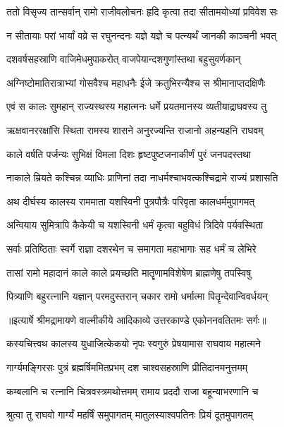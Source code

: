 \twolineshloka
{ततो विसृज्य तान्सर्वान् रामो राजीवलोचनः}
{हृदि कृत्वा तदा सीतामयोध्यां प्रविवेश सः} %

\twolineshloka
{न सीतायाः परां भार्यां वव्रे स रघुनन्दनः}
{यज्ञे यज्ञे च पत्न्यर्थं जानकी काञ्चनी भवत्} %

\twolineshloka
{दशवर्षसहस्राणि वाजिमेधमुपाकरोत्}
{वाजपेयान्दशगुणांस्तथा बहुसुवर्णकान्} %

\twolineshloka
{अग्निष्टोमातिरात्राभ्यां गोसवैश्च महाधनैः}
{ईजे क्रतुभिरन्यैश्च स श्रीमानाप्तदक्षिणैः} %

\twolineshloka
{एवं स कालः सुमहान् राज्यस्थस्य महात्मनः}
{धर्मे प्रयतमानस्य व्यतीयाद्राघवस्य तु} %

\twolineshloka
{ऋक्षवानररक्षांसि स्थिता रामस्य शासने}
{अनुरज्यन्ति राजानो अहन्यहनि राघवम्} %

\twolineshloka
{काले वर्षति पर्जन्यः सुभिक्षं विमला दिशः}
{हृष्टपुष्टजनाकीर्णं पुरं जनपदस्तथा} %

\twolineshloka
{नाकाले म्रियते कश्चिन्न व्याधिः प्राणिनां तदा}
{नाधर्मश्चाभवत्कश्चिद्रामे राज्यं प्रशासति} %

\twolineshloka
{अथ दीर्घस्य कालस्य राममाता यशस्विनी}
{पुत्रपौत्रैः परिवृता कालधर्ममुपागमत्} %

\twolineshloka
{अन्वियाय सुमित्रापि कैकेयी च यशस्विनी}
{धर्मं कृत्वा बहुविधं त्रिदिवे पर्यवस्थिता} %

\twolineshloka
{सर्वाः प्रतिष्ठिताः स्वर्गे राज्ञा दशरथेन च}
{समागता महाभागाः सह धर्मं च लेभिरे} %

\twolineshloka
{तासां रामो महादानं काले काले प्रयच्छति}
{मातॄणामविशेषेण ब्राह्मणेषु तपस्विषु} %

\twolineshloka
{पित्र्याणि बहुरत्नानि यज्ञान् परमदुस्तरान्}
{चकार रामो धर्मात्मा पितॄन्देवान्विवर्धयन्} %


{॥इत्यार्षे श्रीमद्रामायणे वाल्मीकीये आदिकाव्ये उत्तरकाण्डे एकोननवतितमः सर्गः॥}


\twolineshloka
{कस्यचित्त्वथ कालस्य युधाजित्केकयो नृपः}
{स्वगुरुं प्रेषयामास राघवाय महात्मने} %

\twolineshloka
{गार्ग्यमङ्गिरसः पुत्रं ब्रह्मर्षिममितप्रभम्}
{दश चाश्वसहस्राणि प्रीतिदानमनुत्तमम्} %

\twolineshloka
{कम्बलानि च रत्नानि चित्रवस्त्रमथोत्तमम्}
{रामाय प्रददौ राजा बहून्याभरणानि च} %

\twolineshloka
{श्रुत्वा तु राघवो गार्ग्यं महर्षिं समुपागतम्}
{मातुलस्याश्वपतिनः प्रियं दूतमुपागतम्} %

